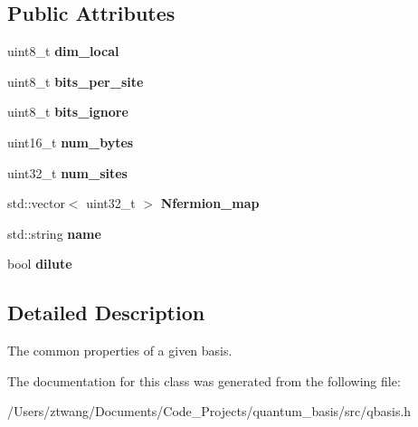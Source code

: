 \subsection*{Public Attributes}
\begin{DoxyCompactItemize}
\item 
\mbox{\label{classqbasis_1_1basis__prop_aa326a913e46796504cecfa9b76a302ea}} 
uint8\+\_\+t {\bfseries dim\+\_\+local}
\item 
\mbox{\label{classqbasis_1_1basis__prop_a850852c3a317519a5d8be2726bffa870}} 
uint8\+\_\+t {\bfseries bits\+\_\+per\+\_\+site}
\item 
\mbox{\label{classqbasis_1_1basis__prop_ae53bd655dba2bbf8a54c8875541d907d}} 
uint8\+\_\+t {\bfseries bits\+\_\+ignore}
\item 
\mbox{\label{classqbasis_1_1basis__prop_aca700fa5c9aae66e42aaa9eb2b7b9349}} 
uint16\+\_\+t {\bfseries num\+\_\+bytes}
\item 
\mbox{\label{classqbasis_1_1basis__prop_afe5546c3a4eeda8115609cf4544c22b6}} 
uint32\+\_\+t {\bfseries num\+\_\+sites}
\item 
\mbox{\label{classqbasis_1_1basis__prop_a43d8778f7812b0f71b0a338484b8e7e6}} 
std\+::vector$<$ uint32\+\_\+t $>$ {\bfseries Nfermion\+\_\+map}
\item 
\mbox{\label{classqbasis_1_1basis__prop_a5eb48dd5220c30bd01f70d8b7e37b895}} 
std\+::string {\bfseries name}
\item 
\mbox{\label{classqbasis_1_1basis__prop_af1f63a0d5fcdf70086160d9ec4d0d9b4}} 
bool {\bfseries dilute}
\end{DoxyCompactItemize}


\subsection{Detailed Description}
The common properties of a given basis. 



The documentation for this class was generated from the following file\+:\begin{DoxyCompactItemize}
\item 
/\+Users/ztwang/\+Documents/\+Code\+\_\+\+Projects/quantum\+\_\+basis/src/qbasis.\+h\end{DoxyCompactItemize}

